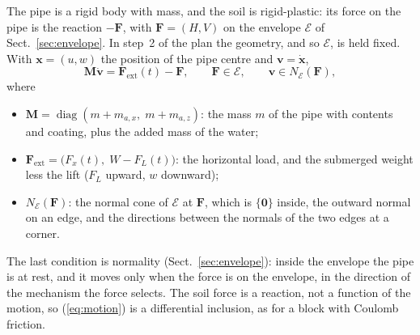\documentclass[11pt,a4paper]{article}
\begin{document}
The pipe is a rigid body with mass, and the soil is rigid-plastic: its
force on the pipe is the reaction $-\mathbf{F}$, with
$\mathbf{F} = (H, V)$ on the envelope $\mathcal{E}$ of
Sect.~\ref{sec:envelope}.  In step~2 of the plan the geometry, and so
$\mathcal{E}$, is held fixed.  With $\mathbf{x} = (u, w)$ the position
of the pipe centre and $\mathbf{v} = \dot{\mathbf{x}}$,
\begin{equation}
  \mathbf{M}\dot{\mathbf{v}} = \mathbf{F}_\text{ext}(t) - \mathbf{F},
  \qquad \mathbf{F} \in \mathcal{E},
  \qquad \mathbf{v} \in N_\mathcal{E}(\mathbf{F}),
  \label{eq:motion}
\end{equation}
where
\begin{itemize}
  \item $\mathbf{M} = \operatorname{diag}(m + m_{a,x},\; m + m_{a,z})$:
    the mass $m$ of the pipe with contents and coating, plus the added
    mass of the water;
  \item $\mathbf{F}_\text{ext} = \bigl(F_x(t),\; W - F_L(t)\bigr)$: the
    horizontal load, and the submerged weight less the lift ($F_L$
    upward, $w$ downward);
  \item $N_\mathcal{E}(\mathbf{F})$: the normal cone of $\mathcal{E}$
    at $\mathbf{F}$, which is $\{\mathbf{0}\}$ inside, the outward
    normal on an edge, and the directions between the normals of the
    two edges at a corner.
\end{itemize}
The last condition is normality (Sect.~\ref{sec:envelope}): inside the
envelope the pipe is at rest, and it moves only when the force is on
the envelope, in the direction of the mechanism the force selects.
The soil force is a reaction, not a function of the motion, so
(\ref{eq:motion}) is a differential inclusion, as for a block with
Coulomb friction.
\end{document}
